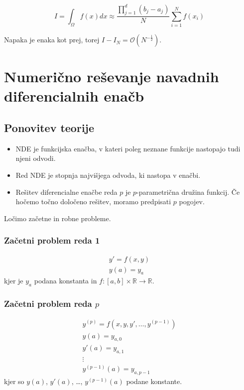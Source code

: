 \documentclass[a4paper,12pt]{article}
\theoremstyle{definition}
\theoremstyle{remark}
\newcommand{\R}{\mathbb{R}}
\begin{document}
\begin{equation*}
    I = \int_{\Omega} f(x) dx \approx \frac{\prod_{j=1}^{d} (b_j - a_j)}{N} \sum_{i=1}^{N} f(x_i)
\end{equation*}

Napaka je enaka kot prej, torej $I - I_N = \mathcal{O}(N^{-\frac{1}{2}})$.

\newpage
\section{Numerično reševanje navadnih diferencialnih enačb}

\subsection{Ponovitev teorije}
\begin{itemize}
    \item NDE je funkcijska enačba, v kateri poleg neznane funkcije nastopajo tudi njeni odvodi.
    \item Red NDE je stopnja najvišjega odvoda, ki nastopa v enačbi.
    \item Rešitev diferencialne enačbe reda $p$ je $p$-parametrična družina funkcij. Če hočemo točno določeno rešitev, moramo predpisati $p$ pogojev.
\end{itemize}

Ločimo začetne in robne probleme.

\subsubsection{Začetni problem reda 1}

\begin{gather*}
    y' = f(x, y) \\
    y(a) = y_a
\end{gather*}
kjer je $y_a$ podana konstanta in $f: [a, b] \times \R \to \R$.

\subsubsection{Začetni problem reda $p$}
\begin{gather*}
    y^{(p)} = f(x, y, y', \dots, y^{(p-1)}) \\
    y(a) = y_{a, 0} \\
    y'(a) = y_{a, 1} \\
    \vdots \\
    y^{(p-1)}(a) = y_{a, p-1}
\end{gather*}
kjer so $y(a)$, $y'(a)$, \dots, $y^{(p-1)}(a)$ podane konstante.
\end{document}
